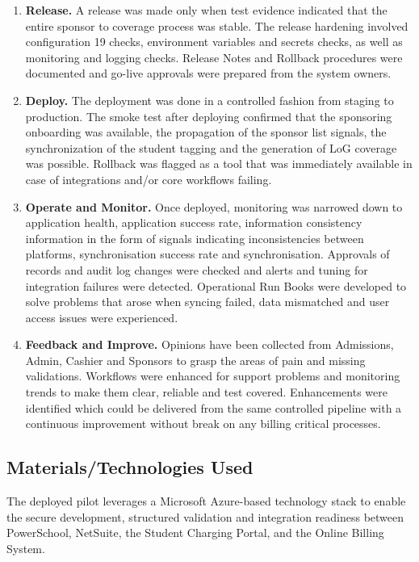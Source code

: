 \begin{enumerate}
        \item \textbf{Release.} A release was made only when test evidence indicated that the entire sponsor to coverage process was stable. The release hardening involved configuration 19 checks, environment variables and secrets checks, as well as monitoring and logging checks. Release Notes and Rollback procedures were documented and go-live approvals were prepared from the system owners.
    
        \item \textbf{Deploy.} The deployment was done in a controlled fashion from staging to production. The smoke test after deploying confirmed that the sponsoring onboarding was available, the propagation of the sponsor list signals, the synchronization of the student tagging and the generation of LoG coverage was possible. Rollback was flagged as a tool that was immediately available in case of integrations and/or core workflows failing.
    
        \item \textbf{Operate and Monitor.} Once deployed, monitoring was narrowed down to application health, application success rate, information consistency information in the form of signals indicating inconsistencies between platforms, synchronisation success rate and synchronisation. Approvals of records and audit log changes were checked and alerts and tuning for integration failures were detected. Operational Run Books were developed to solve problems that arose when syncing failed, data mismatched and user access issues were experienced. 

        \item \textbf{Feedback and Improve.} Opinions have been collected from Admissions, Admin, Cashier and Sponsors to grasp the areas of pain and missing validations. Workflows were enhanced for support problems and monitoring trends to make them clear, reliable and test covered. Enhancements were identified which could be delivered from the same controlled pipeline with a continuous improvement without break on any billing critical processes.
    \end{enumerate}
   
    \subsection{Materials/Technologies Used}
    
    The deployed pilot leverages a Microsoft Azure-based technology stack to enable the secure development, structured validation and integration readiness between PowerSchool, NetSuite, the Student Charging Portal, and the Online Billing System.
    
